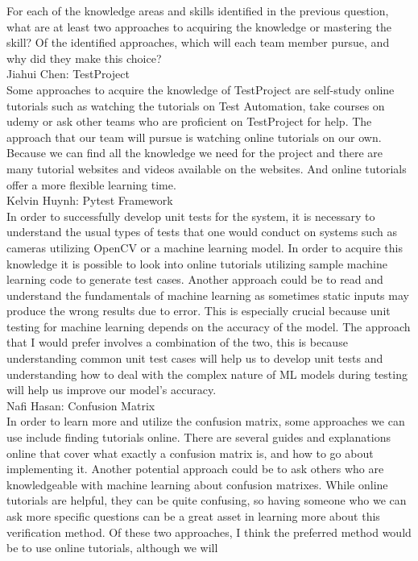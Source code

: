 \documentclass[12pt]{article}
\begin{document}
\begin{outline}[enumerate]
  \1 For each of the knowledge areas and skills identified in the previous question, what are at least two approaches to acquiring the knowledge or
  mastering the skill? Of the identified approaches, which will each team member pursue, and why did they make this choice?\\
    \2 Jiahui Chen: TestProject\\
    Some approaches to acquire the knowledge of TestProject are self-study online tutorials such as watching the tutorials on Test Automation, take courses on udemy or ask 
    other teams who are proficient on TestProject for help. The approach that our team will pursue is watching online tutorials on our own. Because we can find all the 
    knowledge we need for the project and there are many tutorial websites and videos available on the websites. And online tutorials offer a more flexible learning time.\\
    \2 Kelvin Huynh: Pytest Framework\\
    In order to successfully develop unit tests for the system, it is necessary to understand the usual types of tests that one would conduct on systems such as cameras 
    utilizing OpenCV or a machine learning model. In order to acquire this knowledge it is possible to look into online tutorials utilizing sample machine learning code to 
    generate test cases. Another approach could be to read and understand the fundamentals of machine learning as sometimes static inputs may produce the wrong results due 
    to error. This is especially crucial because unit testing for machine learning depends on the accuracy of the model. The approach that I would prefer involves a combination 
    of the two, this is because understanding common unit test cases will help us to develop unit tests and understanding how to deal with the complex nature of ML models 
    during testing will help us improve our model’s accuracy.\\
    \2 Nafi Hasan: Confusion Matrix\\
In order to learn more and utilize the confusion matrix, some approaches we can use include finding tutorials online. There are several guides and explanations online
that cover what exactly a confusion matrix is, and how to go about implementing it. Another potential approach could be to ask others who are knowledgeable with machine 
learning about confusion matrixes. While online tutorials are helpful, they can be quite confusing, so having someone who we can ask more specific questions can be a 
great asset in learning more about this verification method. Of these two approaches, I think the preferred method would be to use online tutorials, although we will 

\end{outline}
\end{document}
